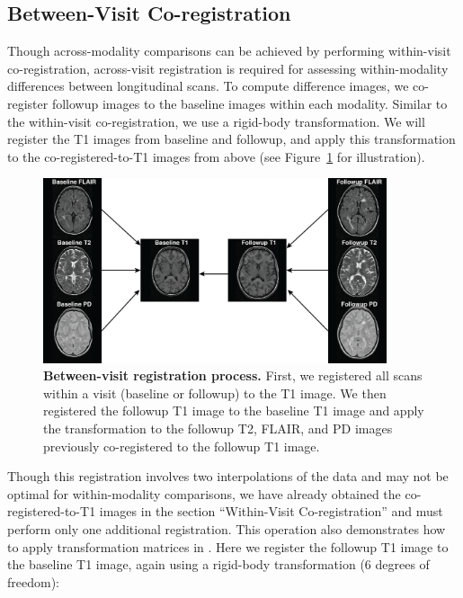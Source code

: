 \documentclass[a4paper]{report}\usepackage[]{graphicx}\usepackage[]{color}
\let\pkg=\strong
\begin{document}
\begin{article}
\section{Between-Visit Co-registration}
Though across-modality comparisons can be achieved by performing within-visit co-registration, across-visit registration is required for assessing within-modality differences between longitudinal scans.   To compute difference images, we co-register followup images to the baseline images within each modality.  Similar to the within-visit co-registration, we use a rigid-body transformation.  We will register the T1 images from baseline and followup, and apply this transformation to the co-registered-to-T1 images from above (see Figure~\ref{fig:reg} for illustration).  

\begin{figure}
\centering
\includegraphics[width = 0.9\textwidth]{Reg_Figure_Option1.png}
\caption{{\bf Between-visit registration process.}  First, we registered all scans within a visit (baseline or followup) to the T1 image.  We then registered the followup T1 image to the baseline T1 image and apply the transformation to the followup T2, FLAIR, and PD images previously co-registered to the followup T1 image. }
\label{fig:reg}
\end{figure}

Though this registration involves two interpolations of the data and may not be optimal for within-modality comparisons, we have already obtained the co-registered-to-T1 images in the section ``Within-Visit Co-registration'' and must perform only one additional registration.  This operation also demonstrates how to apply transformation matrices in \pkg{fslr}.  Here we register the followup T1 image to the baseline T1 image, again using a rigid-body transformation (6 degrees of freedom):


\end{article}
\end{document}

